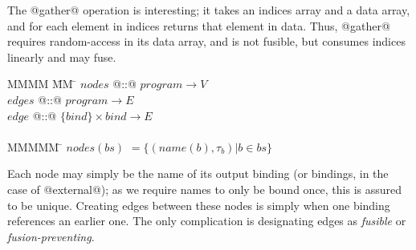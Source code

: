 The @gather@ operation is interesting; it takes an indices array and a data array, and for each element in indices returns that element in data.
Thus, @gather@ requires random-access in its data array, and is not fusible, but consumes indices linearly and may fuse.

\begin{tabbing}
MMMM        \= MM   \= \kill
$nodes$     \> @::@ \> $program \to V$          \\
$edges$     \> @::@ \> $program \to E$          \\
$edge$      \> @::@ \> $\{bind\} \times bind \to E$\\
\\
MMMMM       \= \kill
$nodes(bs)$ \> $= \{(name(b), \tau_b) | b \in bs\}$       \\
\end{tabbing}
Each node may simply be the name of its output binding (or bindings, in the case of @external@); as we require names to only be bound once, this is assured to be unique.
Creating edges between these nodes is simply when one binding references an earlier one. The only complication is designating edges as \emph{fusible} or \emph{fusion-preventing}.

